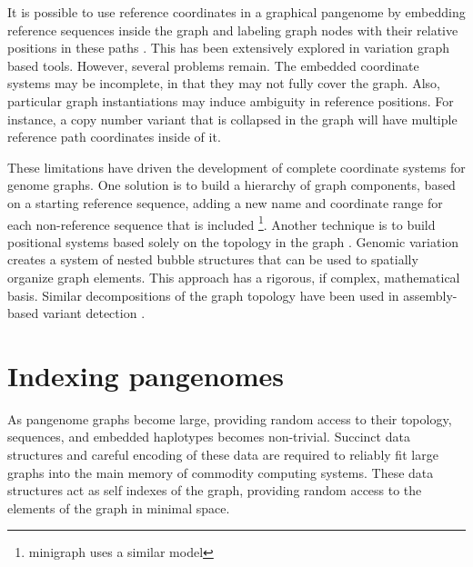 It is possible to use reference coordinates in a graphical pangenome by embedding reference sequences inside the graph and labeling graph nodes with their relative positions in these paths \cite{Garrison_2018,Garrison_2019}.
This has been extensively explored in variation graph based tools.
However, several problems remain.
The embedded coordinate systems may be incomplete, in that they may not fully cover the graph.
Also, particular graph instantiations may induce ambiguity in reference positions.
For instance, a copy number variant that is collapsed in the graph will have multiple reference path coordinates inside of it.

These limitations have driven the development of complete coordinate systems for genome graphs.
One solution is to build a hierarchy of graph components, based on a starting reference sequence, adding a new name and coordinate range for each non-reference sequence that is included \cite{Rand_2017}\footnote{minigraph uses a similar model}.
Another technique is to build positional systems based solely on the topology in the graph \cite{paten2018superbubbles}.
Genomic variation creates a system of nested bubble structures that can be used to spatially organize graph elements.
This approach has a rigorous, if complex, mathematical basis.
Similar decompositions of the graph topology have been used in assembly-based variant detection \cite{Iqbal_2012, Onodera_2013}.


\section{Indexing pangenomes} %
\label{sec:indexing}

As pangenome graphs become large, providing random access to their topology, sequences, and embedded haplotypes becomes non-trivial.
Succinct data structures and careful encoding of these data are required to reliably fit large graphs into the main memory of commodity computing systems.
These data structures act as self indexes of the graph, providing random access to the elements of the graph in minimal space.

